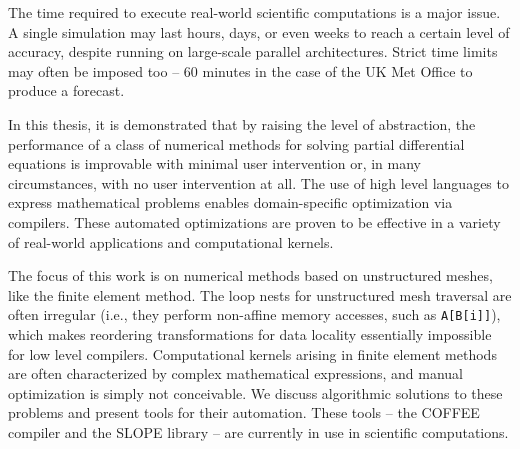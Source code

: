 The time required to execute real-world scientific computations is a major issue. A single simulation may last hours, days, or even weeks to reach a certain level of accuracy, despite running on large-scale parallel architectures. Strict time limits may often be imposed too -- 60 minutes in the case of the UK Met Office to produce a forecast. 

In this thesis, it is demonstrated that by raising the level of abstraction, the performance of a class of numerical methods for solving partial differential equations is improvable with minimal user intervention or, in many circumstances, with no user intervention at all. The use of high level languages to express mathematical problems enables domain-specific optimization via compilers. These automated optimizations are proven to be effective in a variety of real-world applications and computational kernels.

The focus of this work is on numerical methods based on unstructured meshes, like the finite element method. The loop nests for unstructured mesh traversal are often irregular (i.e., they perform non-affine memory accesses, such as {\tt A[B[i]]}), which makes reordering transformations for data locality essentially impossible for low level compilers. Computational kernels arising in finite element methods are often characterized by complex mathematical expressions, and manual optimization is simply not conceivable. We discuss algorithmic solutions to these problems and present tools for their automation. These tools -- the COFFEE compiler and the SLOPE library -- are currently in use in scientific computations.